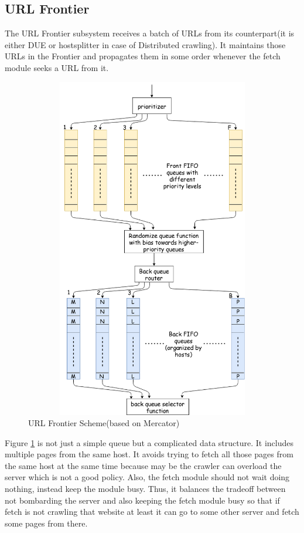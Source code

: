 \pagebreak

\subsection{URL Frontier}\label{scheme}
The URL Frontier\cite{mercator} subsystem receives a batch of URLs from its counterpart(it is either DUE or hostsplitter in case of Distributed crawling). It maintains those URLs in the Frontier and propagates them in some order whenever the fetch module seeks a URL from it.

\begin{figure}[h!]
  \centering
  \includegraphics[width=12cm,height=15cm,keepaspectratio]{../media/crawler/url-frontier.png}
  \caption{URL Frontier Scheme(based on Mercator) \cite{mercator}}
  \label{fig:frontier}
\end{figure}

\noindent
Figure \ref{fig:frontier} is not just a simple queue but a complicated data structure. It includes multiple pages from the same host. It avoids trying to fetch all those pages from the same host at the same time because may be the crawler can overload the server which is not a good policy. Also, the fetch module should not wait doing nothing, instead keep the module busy. Thus, it balances the tradeoff between not
bombarding the server and also keeping the fetch module busy so that if fetch is not crawling that website
at least it can go to some other server and fetch some pages from there.


